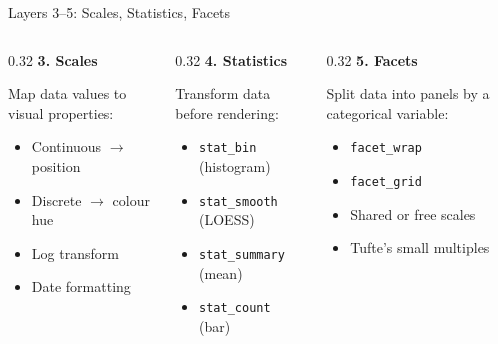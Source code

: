 \documentclass[10pt]{beamer}
\begin{document}
\begin{frame}{Layers 3--5: Scales, Statistics, Facets}
  \begin{columns}[T]
    \begin{column}{0.32\textwidth}
      \textbf{3. Scales}

      Map data values to visual
      properties:

      \begin{itemize}
        \item Continuous $\rightarrow$ position
        \item Discrete $\rightarrow$ colour hue
        \item Log transform
        \item Date formatting
      \end{itemize}
    \end{column}
    \begin{column}{0.32\textwidth}
      \textbf{4. Statistics}

      Transform data before
      rendering:

      \begin{itemize}
        \item \texttt{stat\_bin} (histogram)
        \item \texttt{stat\_smooth} (LOESS)
        \item \texttt{stat\_summary} (mean)
        \item \texttt{stat\_count} (bar)
      \end{itemize}
    \end{column}
    \begin{column}{0.32\textwidth}
      \textbf{5. Facets}

      Split data into panels
      by a categorical variable:

      \begin{itemize}
        \item \texttt{facet\_wrap}
        \item \texttt{facet\_grid}
        \item Shared or free scales
        \item Tufte's small multiples
      \end{itemize}
    \end{column}
  \end{columns}
\end{frame}
\end{document}
